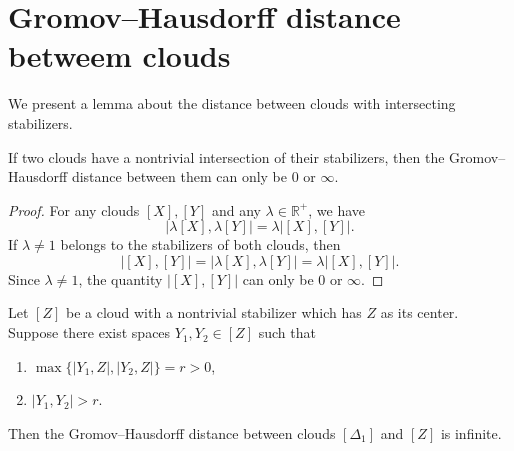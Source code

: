 \documentclass[leqno]{article}
\begin{document}
\section{Gromov--Hausdorff distance betweem clouds}


We present a lemma about the distance between clouds with intersecting stabilizers.

\begin{lemma}\label{lemmaDist}
If two clouds have a nontrivial intersection of their stabilizers, then the Gromov--Hausdorff distance between them can only be $0$ or $\infty$.
\end{lemma}

\begin{proof}
For any clouds $[X], [Y]$ and any $\lambda \in \mathbb{R}^{+}$, we have
$$
\big|\lambda[X], \lambda[Y]\big| = \lambda\big|[X], [Y]\big|.
$$
If $\lambda \neq 1$ belongs to the stabilizers of both clouds, then
$$
\big|[X],[Y]\big| = \big|\lambda[X], \lambda[Y]\big| = \lambda\big|[X], [Y]\big|.
$$
Since $\lambda \neq 1$, the quantity $\big|[X],[Y]\big|$ can only be $0$ or $\infty$.
\end{proof}

\begin{theorem}\label{thrmDist}
Let $[Z]$ be a cloud with a nontrivial stabilizer which has $Z$ as its center. Suppose there exist spaces $Y_{1}, Y_{2} \in [Z]$ such that
\begin{enumerate}
    \item $\max\{ |Y_{1},Z|, |Y_{2}, Z| \} = r > 0$,
    \item $|Y_{1}, Y_{2}| > r$.
\end{enumerate}
Then the Gromov--Hausdorff distance between clouds $[\Delta_1]$ and $[Z]$ is infinite.
\end{theorem}
\end{document}
